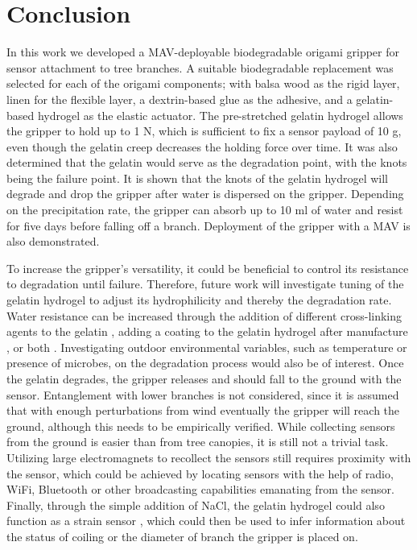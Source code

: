 \section{Conclusion}
In this work we developed a MAV-deployable biodegradable origami gripper for sensor attachment to tree branches. A suitable biodegradable replacement was selected for each of the origami components; with balsa wood as the rigid layer, linen for the flexible layer, a dextrin-based glue as the adhesive, and a gelatin-based hydrogel as the elastic actuator. The pre-stretched gelatin hydrogel allows the gripper to hold up to 1 N, which is sufficient to fix a sensor payload of 10 g, even though the gelatin creep decreases the holding force over time. It was also determined that the gelatin would serve as the degradation point, with the knots being the failure point. It is shown that the knots of the gelatin hydrogel will degrade and drop the gripper after water is dispersed on the gripper. Depending on the precipitation rate, the gripper can absorb up to 10 ml of water and resist for five days before falling off a branch. Deployment of the gripper with a MAV is also demonstrated.

To increase the gripper's versatility, it could be beneficial to control its resistance to degradation until failure. Therefore, future work will investigate tuning of the gelatin hydrogel to adjust its hydrophilicity and thereby the degradation rate. Water resistance can be increased through the addition of different cross-linking agents to the gelatin \cite{Biscarat2015, Gomez-Estaca2011, Ahammed2020, Chaochai2016, Wang2020}, adding a coating to the gelatin hydrogel after manufacture \cite{Chen2018}, or both \cite{Stoessel2015}. Investigating outdoor environmental variables, such as temperature or presence of microbes, on the degradation process would also be of interest. Once the gelatin degrades, the gripper releases and should fall to the ground with the sensor. Entanglement with lower branches is not considered, since it is assumed that with enough perturbations from wind eventually the gripper will reach the ground, although this needs to be empirically verified. While collecting sensors from the ground is easier than from tree canopies, it is still not a trivial task. Utilizing large electromagnets to recollect the sensors \cite{Iyer2022} still requires proximity with the sensor, which could be achieved by locating sensors with the help of radio, WiFi, Bluetooth or other broadcasting capabilities emanating from the sensor. Finally, through the simple addition of NaCl, the gelatin hydrogel could also function as a strain sensor \cite{Hardman2022}, which could then be used to infer information about the status of coiling or the diameter of branch the gripper is placed on.

